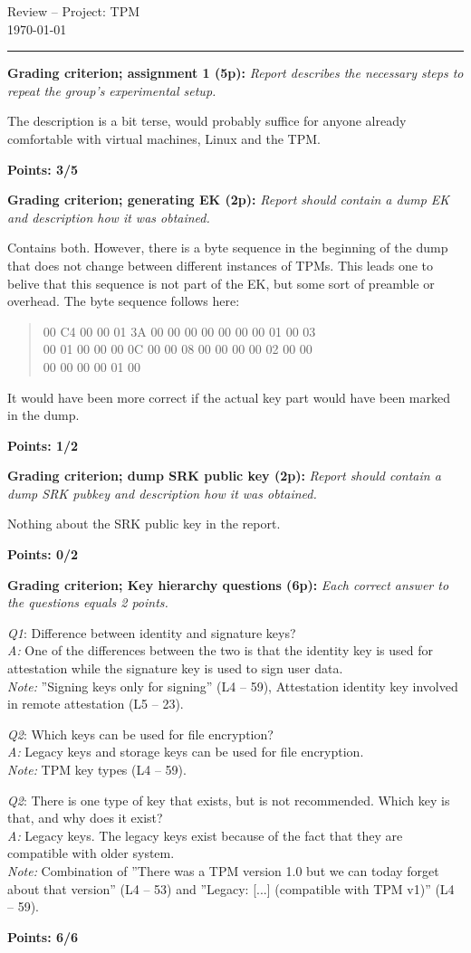 \documentclass{article}
\newcommand{\grade}[5]{
  \textbf{Grading criterion; #1 (#3p):}\textit{#4}

  #5
  \hfill
  \begin{varwidth}{\linewidth}
    \textbf{Points: #2/#3}
  \end{varwidth}
}
\newcommand{\QAN}[5]{
  \textit{Q#1}:#3  \\
  \ifthenelse{\equal{#2}{C}}{
    \def \grading {\Large\textcolor{green}{\checkmark}\normalsize}
  }{
    \def \grading {\Large\textcolor{red}{\textbf{x}\hspace{0.142cm}}\normalsize}
  }
  \textit{A:}#4\hfill\grading \\
  \textit{Note:}#5
}
\begin{document}
  \begin{center}
    \huge{Review -- Project: TPM} \\
    \vspace{0.2cm}
    \Large{\today}
    \vspace{0.4cm}
    \hrule
  \end{center}

  \grade{assignment 1}{3}{5}
  {
    Report describes the necessary steps to repeat the group's
    experimental setup.
  }
  {
    The description is a bit terse, would probably suffice for anyone already
    comfortable with virtual machines, Linux and the TPM.
  }

  \grade{generating EK}{1}{2}
  {
    Report should contain a dump EK and description how it was obtained.
  }
  {
    Contains both. However, there is a byte sequence in the beginning of the dump that does not change between different instances of TPMs. This leads one to belive that this sequence is not part of the EK, but some sort of preamble or overhead. 
The byte sequence follows here: 
\begin{quote}
00 C4 00 00 01 3A 00 00 00 00 00 00 00 01 00 03 \\
00 01 00 00 00 0C 00 00 08 00 00 00 00 02 00 00 \\
00 00 00 00 01 00
\end{quote}

It would have been more correct if the actual key part would have been marked in the dump.
  }

  \grade{dump SRK public key}{0}{2}
  {
    Report should contain a dump SRK pubkey and description how it was
    obtained.
  }
  {
    Nothing about the SRK public key in the report.
  }

  \grade{Key hierarchy questions}{6}{6}
  {
    Each correct answer to the questions equals 2 points.
  }
  {
    \QAN{1}{C}{
      Difference between identity and signature keys?
    }
    {
      One of the differences between the two is that the identity key is used
      for attestation while the signature key is used to sign user data.
    }
    {
      ''Signing keys only for signing'' (L4 -- 59), Attestation identity
      key involved in remote attestation (L5 -- 23).
    }

    \QAN{2}{C}{
      Which keys can be used for file encryption?
    }
    {
      Legacy keys and storage keys can be used for file encryption.
    }
    {
      TPM key types (L4 -- 59).
    }

    \QAN{2}{C}{
      There is one type of key that exists, but is not recommended. Which key
      is that, and why does it exist?
    }
    {
      Legacy keys. The legacy keys exist because of the fact that they are
      compatible with older system.
    }
    {
      Combination of ''There was a TPM version 1.0 but we can today forget
      about that version'' (L4 -- 53) and ''Legacy: [...] (compatible with TPM
      v1)'' (L4 -- 59).
    }
  }
\end{document}
